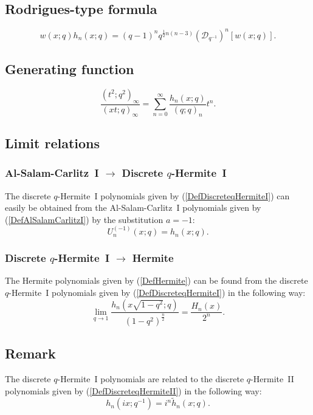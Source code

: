 \documentclass[envcountchap,graybox]{svmono}
\newcounter{rom}
\begin{document}
{{\subsection*{Rodrigues-type formula}
\begin{equation}
\label{RodDiscreteqHermiteI}
w(x;q)h_n(x;q)=(q-1)^nq^{\frac{1}{2}n(n-3)}
\left(\mathcal{D}_{q^{-1}}\right)^n\left[w(x;q)\right].
\end{equation}

\subsection*{Generating function}
\begin{equation}
\label{GenDiscreteqHermiteI}
\frac{(t^2;q^2)_{\infty}}{(xt;q)_{\infty}}=
\sum_{n=0}^{\infty}\frac{h_n(x;q)}{(q;q)_n}t^n.
\end{equation}

\subsection*{Limit relations}

\subsubsection*{Al-Salam-Carlitz~I $\rightarrow$ Discrete $q$-Hermite~I}
The discrete $q$-Hermite~I polynomials given by
(\ref{DefDiscreteqHermiteI}) can easily be obtained from the
Al-Salam-Carlitz~I polynomials given by (\ref{DefAlSalamCarlitzI}) by the
substitution $a=-1$:
$$U_n^{(-1)}(x;q)=h_n(x;q).$$

\subsubsection*{Discrete $q$-Hermite~I $\rightarrow$ Hermite}
The Hermite polynomials given by (\ref{DefHermite}) can be found
from the discrete $q$-Hermite~I polynomials given by
(\ref{DefDiscreteqHermiteI}) in the following way:
\begin{equation}
\lim_{q\rightarrow 1}\frac{h_n(x\sqrt{1-q^2};q)}
{(1-q^2)^{\frac{n}{2}}}=\frac{H_n(x)}{2^n}.
\end{equation}

\subsection*{Remark} The discrete $q$-Hermite~I polynomials are related to the
discrete $q$-Hermite~II polynomials given by (\ref{DefDiscreteqHermiteII})
in the following way:
$$h_n(ix;q^{-1})=i^n{\tilde h}_n(x;q).$$

}}
\end{document}
